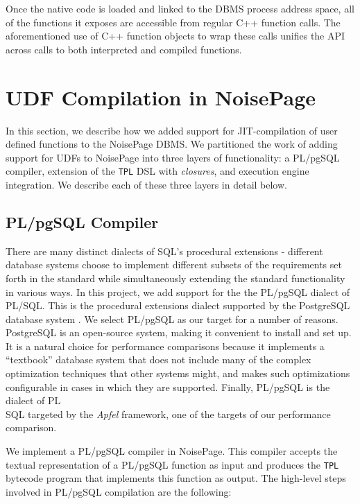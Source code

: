 \documentclass{vldb}
\newcommand{\tpl}{\texttt{TPL}\xspace}
\newcommand{\plpgsql}{PL/pgSQL\xspace}
\begin{document}
Once the native code is loaded and linked to the DBMS process address space, all of the functions it exposes are accessible from regular C++ function calls. The aforementioned use of C++ function objects to wrap these calls unifies the API across calls to both interpreted and compiled functions.


\section{UDF Compilation in NoisePage}

In this section, we describe how we added support for JIT-compilation of user defined functions to the NoisePage DBMS. We partitioned the work of adding support for UDFs to NoisePage into three layers of functionality: a \plpgsql compiler, extension of the \tpl DSL with \textit{closures}, and execution engine integration. We describe each of these three layers in detail below. 

\subsection{\plpgsql Compiler}

There are many distinct dialects of SQL's procedural extensions - different database systems choose to implement different subsets of the requirements set forth in the standard while simultaneously extending the standard functionality in various ways. In this project, we add support for the the \plpgsql dialect of PL/SQL. This is the procedural extensions dialect supported by the PostgreSQL database system \cite{postgresql}. We select \plpgsql as our target for a number of reasons. PostgreSQL is an open-source system, making it convenient to install and set up. It is a natural choice for performance comparisons because it implements a ``textbook'' database system that does not include many of the complex optimization techniques that other systems might, and makes such optimizations configurable in cases in which they are supported. Finally, \plpgsql is the dialect of PL\\SQL targeted by the \textit{Apfel} framework, one of the targets of our performance comparison.

We implement a \plpgsql compiler in NoisePage. This compiler accepts the textual representation of a \plpgsql function as input and produces the \tpl bytecode program that implements this function as output. The high-level steps involved in \plpgsql compilation are the following:
\end{document}
